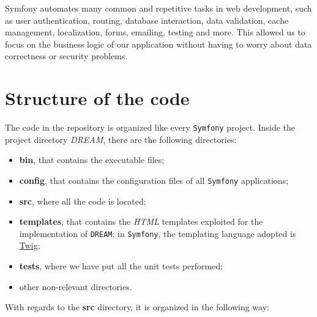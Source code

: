 \documentclass{article}
\begin{document}
Symfony automates many common and repetitive tasks in web development, such as user authentication, routing, database interaction, data validation, cache management, localization, forms, emailing, testing and more. This allowed us to focus on the business logic of our application without having to worry about data correctness or security problems.

\newpage
\section{Structure of the code}
The code in the repository is organized like every \verb|Symfony| project. Inside the project directory \textit{DREAM}, there are the following directories:
\begin{itemize}
    \item \textbf{bin}, that contains the executable files;
    \item \textbf{config}, that contains the configuration files of all \verb|Symfony| applications;
    \item \textbf{src}, where all the code is located;
    \item \textbf{templates}, that contains the \textit{HTML} templates exploited for the implementation of \verb|DREAM|; in \verb|Symfony|, the templating language adopted is \href{https://twig.symfony.com/}{Twig};
    \item \textbf{tests}, where we have put all the unit tests performed;
    \item other non-relevant directories.
\end{itemize}
With regards to the \textbf{src} directory, it is organized in the following way:
\end{document}
